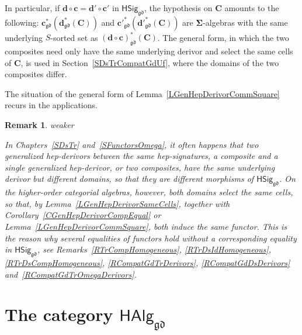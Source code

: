 \documentclass[a4paper, reqno]{amsbook}
\makeatletter
\newcommand{\sig}[1]{\mathbf{#1}}             %
\newcommand{\gd}{\mathfrak{gd}}              %
\theoremstyle{plain}
\newtheorem{remark}[theorem]{Remark}
\theoremstyle{definition}
\newcommand*{\CA@leanpending}{}
\newcommand*{\CA@leanrelation}{}
\newcommand*{\lean}[2]{%
  \ifcsname\string\color@lean@#1\endcsname\else
    \PackageError{main}{Unknown relation `#1' in \string\lean}{Use equivalent, weaker or stronger.}%
  \fi
  \gdef\CA@leanrelation{#1}%
  \gdef\CA@leanpending{#2}}
\makeatother
\begin{document}
In particular, if $\mathbf{d}\circ\mathbf{c}=\mathbf{d}'\circ\mathbf{c}'$ in $\mathsf{HSig}_{\gd}$, the hypothesis on $\mathbf{C}$ amounts to the following: $\mathbf{c}^{\ast}_{\gd}(\mathbf{d}^{\ast}_{\gd}(\mathbf{C}))$ and $\mathbf{c}'^{\ast}_{\gd}(\mathbf{d}'^{\ast}_{\gd}(\mathbf{C}))$ are $\sig{\Sigma}$-algebras with the same underlying $S$-sorted set as $(\mathbf{d}\circ\mathbf{c})^{\ast}_{\gd}(\mathbf{C})$.
The general form, in which the two composites need only have the same underlying derivor and select the same cells of $\mathbf{C}$, is used in Section~\ref{SDsTrCompatGdUf}, where the domains of the two composites differ.

The situation of the general form of Lemma~\ref{LGenHepDerivorCommSquare} recurs in the applications.

\begin{remark}\label{RSameCellsPattern}\lean{weaker}{GeneralizedHepDerivor.sameCellsNatIso}
In Chapters~\ref{SDsTr} and~\ref{SFunctorsOmega}, it often happens that two generalized hep-derivors between the same hep-signatures, a composite and a single generalized hep-derivor, or two composites, have the same underlying derivor but different domains, so that they are different morphisms of $\mathsf{HSig}_{\gd}$.
On the higher-order categorial algebras, however, both domains select the same cells, so that, by Lemma~\ref{LGenHepDerivorSameCells}, together with Corollary~\ref{CGenHepDerivorCompEqual} or Lemma~\ref{LGenHepDerivorCommSquare}, both induce the same functor.
This is the reason why several equalities of functors hold without a corresponding equality in $\mathsf{HSig}_{\gd}$, see Remarks~\ref{RTrCompHomogeneous}, \ref{RTrDsIdHomogeneous}, \ref{RTrDsCompHomogeneous}, \ref{RCompatGdTrDerivors}, \ref{RCompatGdDsDerivors} and~\ref{RCompatGdTrOmegaDerivors}.
\end{remark}

\section{The category \texorpdfstring{$\mathsf{HAlg}_{\gd}$}{HAlggd}}\label{SHepAlgCat}
\end{document}
